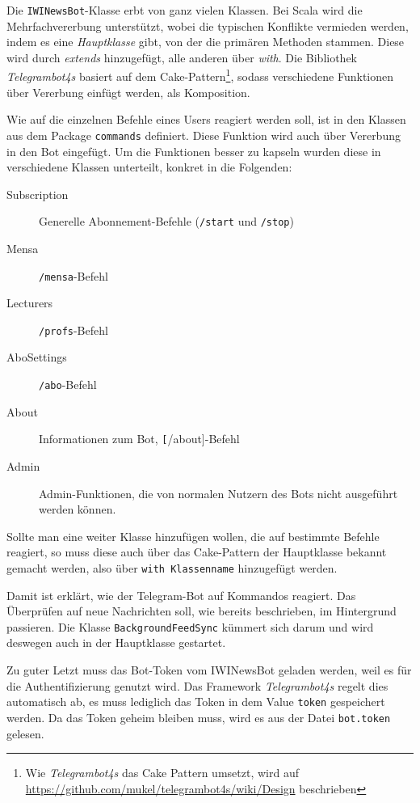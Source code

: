Die \texttt{IWINewsBot}-Klasse erbt von ganz vielen Klassen. Bei Scala wird die Mehrfachvererbung unterstützt, wobei die typischen Konflikte vermieden werden, indem es eine \emph{Hauptklasse} gibt, von der die primären Methoden stammen. Diese wird durch \emph{extends} hinzugefügt, alle anderen über \emph{with}. Die Bibliothek \emph{Telegrambot4s} basiert auf dem Cake-Pattern\footnote{Wie \emph{Telegrambot4s} das Cake Pattern umsetzt, wird auf \url{https://github.com/mukel/telegrambot4s/wiki/Design} beschrieben}, sodass verschiedene Funktionen über Vererbung einfügt werden, als Komposition.

Wie auf die einzelnen Befehle eines Users reagiert werden soll, ist in den Klassen aus dem Package \texttt{commands} definiert. Diese Funktion wird auch über Vererbung in den Bot eingefügt. Um die Funktionen besser zu kapseln wurden diese in verschiedene Klassen unterteilt, konkret in die Folgenden:

\begin{description}
  \item[Subscription] Generelle Abonnement-Befehle (\texttt{/start} und \texttt{/stop})
  \item[Mensa] \texttt{/mensa}-Befehl
  \item[Lecturers] \texttt{/profs}-Befehl
  \item[AboSettings] \texttt{/abo}-Befehl
  \item[About] Informationen zum Bot, \texttt[/about]-Befehl
  \item[Admin] Admin-Funktionen, die von normalen Nutzern des Bots nicht ausgeführt werden können.
\end{description}

Sollte man eine weiter Klasse hinzufügen wollen, die auf bestimmte Befehle reagiert, so muss diese auch über das Cake-Pattern der Hauptklasse bekannt gemacht werden, also über \texttt{with Klassenname} hinzugefügt werden.

Damit ist erklärt, wie der Telegram-Bot auf Kommandos reagiert. Das Überprüfen auf neue Nachrichten soll, wie bereits beschrieben, im Hintergrund passieren. Die Klasse \texttt{BackgroundFeedSync} kümmert sich darum und wird deswegen auch in der Hauptklasse gestartet.

Zu guter Letzt muss das Bot-Token vom IWINewsBot geladen werden, weil es für die  Authentifizierung genutzt wird. Das Framework \emph{Telegrambot4s} regelt dies automatisch ab, es muss lediglich das Token in dem Value \texttt{token} gespeichert werden. Da das Token geheim bleiben muss, wird es aus der Datei \texttt{bot.token} gelesen.

